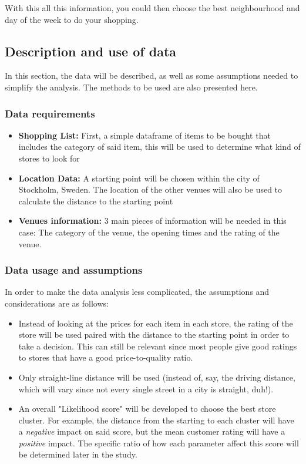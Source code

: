 \documentclass{article}
\begin{document}
		With this all this information, you could then choose the best neighbourhood and day of the week to do your shopping. 
	
	\subsection{Description and use of data}
		In this section, the data will be described, as well as some assumptions needed to simplify the analysis. The methods to be used are also presented here. 
		
		\subsubsection{Data requirements}
		\begin{itemize}
			\item \textbf{Shopping List:} First, a simple dataframe of items to be bought that includes the category of said item, this will be used to determine what kind of stores to look for 
			\item \textbf{Location Data:} A starting point will be chosen within the city of Stockholm, Sweden. The location of the other venues will also be used to calculate the distance to the starting point
			\item \textbf{Venues information:} 3 main pieces of information will be needed in this case: The category of the venue, the opening times and the rating of the venue. 			
		\end{itemize}
		\subsubsection{Data usage and assumptions}
			In order to make the data analysis less complicated, the assumptions and considerations are as follows:
			\begin{itemize}
				\item Instead of looking at the prices for each item in each store, the rating of the store will be used paired with the distance to the starting point in order to take a decision. This can still be relevant since most people give good ratings to stores that have a good price-to-quality ratio.
				\item Only straight-line distance will be used (instead of, say, the driving distance, which will vary since not every single street in a city is straight, duh!).
				\item An overall "Likelihood score" will be developed to choose the best store cluster. For example, the distance from the starting to each cluster will have a \textit{negative} impact on said score, but the mean customer rating will have a \textit{positive} impact. The specific ratio of how each parameter affect this score will be determined later in the study.
			\end{itemize} 	
		\newpage
\end{document}
